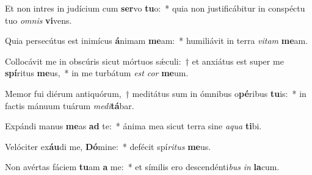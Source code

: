 \item Et non intres in judícium cum \textbf{ser}vo \textbf{tu}o:~* quia non justificábitur in conspéctu tuo \textit{om}\textit{nis} \textbf{vi}vens.
\item Quia persecútus est inimícus \textbf{á}nimam \textbf{me}am:~* humiliávit in terra \textit{vi}\textit{tam} \textbf{me}am.
\item Collocávit me in obscúris sicut mórtuos sǽculi:~† et anxiátus est super me \textbf{spí}ritus \textbf{me}us,~* in me turbátum \textit{est} \textit{cor} \textbf{me}um.
\item Memor fui diérum antiquórum,~† meditátus sum in ómnibus o\textbf{pé}ribus \textbf{tu}is:~* in factis mánuum tuárum \textit{me}\textit{di}\textbf{tá}bar.
\item Expándi manus \textbf{me}as \textbf{ad} te:~* ánima mea sicut terra sine \textit{a}\textit{qua} \textbf{ti}bi.
\item Velóciter ex\textbf{áu}di me, \textbf{Dó}mine:~* defécit spí\textit{ri}\textit{tus} \textbf{me}us.
\item Non avértas fáciem \textbf{tu}am \textbf{a} me:~* et símilis ero descendénti\textit{bus} \textit{in} \textbf{la}cum.
